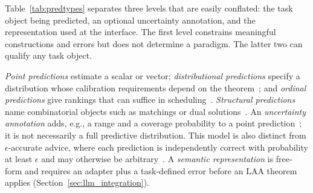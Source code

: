 \documentclass[acmsmall,screen,nonacm]{acmart}
\theoremstyle{acmdefinition}%
\begin{document}
Table~\ref{tab:predtypes} separates three levels that are easily conflated: the task object being predicted, an optional uncertainty annotation, and the representation used at the interface. The first level constrains meaningful constructions and errors but does not determine a paradigm. The latter two can qualify any task object.

\emph{Point predictions} estimate a scalar or vector; \emph{distributional predictions} specify a distribution whose calibration requirements depend on the theorem~\cite{dinitz2024binarysearch,angelopoulos2024distributional}; and \emph{ordinal predictions} give rankings that can suffice in scheduling~\cite{lindermayr2023speed}. \emph{Structural predictions} name combinatorial objects such as matchings or dual solutions~\cite{dinitz2021duals,lavastida2021instancerobust}. An \emph{uncertainty annotation} adds, e.g., a range and a coverage probability to a point prediction~\cite{sun2024uncertainty}; it is not necessarily a full predictive distribution. This model is also distinct from $\epsilon$-accurate advice, where each prediction is independently correct with probability at least $\epsilon$ and may otherwise be arbitrary~\cite{gupta2022epsilon}. A \emph{semantic representation} is free-form and requires an adapter plus a task-defined error before an LAA theorem applies (Section~\ref{sec:llm_integration}).
\end{document}

